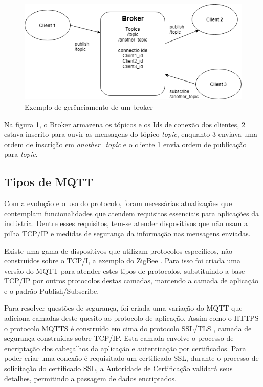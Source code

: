 \begin{figure}[h]
\centering
\includegraphics[width=12cm]{./02_Capitulos/02_Cap3/figures/broker_pub_sub}
\caption{Exemplo de gerênciamento de um broker}
\label{fig:3.2.0/broker_pub_sub}
\end{figure}

Na figura \ref{fig:3.2.0/broker_pub_sub}, o Broker armazena os tópicos e os Ids de conexão dos clientes, 2 estava inscrito para ouvir as mensagens do tópico \textit{topic}, enquanto 3 enviava uma ordem de inscrição em \textit{another\_topic} e o cliente 1 envia ordem de publicação para \textit{topic}.


\subsection{Tipos de MQTT}
\label{subsection:tipos_mqtt}

Com a evolução e o uso do protocolo, foram necessárias atualizações que contemplam funcionalidades que atendem  requisitos essenciais para aplicações da indústria. Dentre esses requisitos, tem-se atender dispositivos que não usam a pilha TCP/IP e medidas de segurança da informação nas mensagens enviadas. 

Existe uma gama de dispositivos que utilizam protocolos específicos, não construídos sobre o TCP/I, a exemplo do ZigBee \cite{zigbee}. Para isso foi criada uma versão do MQTT para atender estes tipos de protocolos, substituindo a base TCP/IP por outros protocolos destas camadas, mantendo a camada de aplicação e o padrão Publish/Subscribe.

Para resolver questões de segurança, foi criada uma variação do MQTT que adiciona camadas deste quesito ao protocolo de aplicação. Assim como o HTTPS o protocolo MQTTS é construído em cima do protocolo SSL/TLS \cite{ssl}, camada de segurança construídas sobre TCP/IP. Esta camada envolve o processo de encriptação dos cabeçalhos da aplicação e autenticação por certificados. Para poder criar uma conexão é requisitado um certificado SSL, durante o processo de solicitação do certificado SSL, a Autoridade de Certificação validará seus detalhes, permitindo a passagem de dados encriptados.

